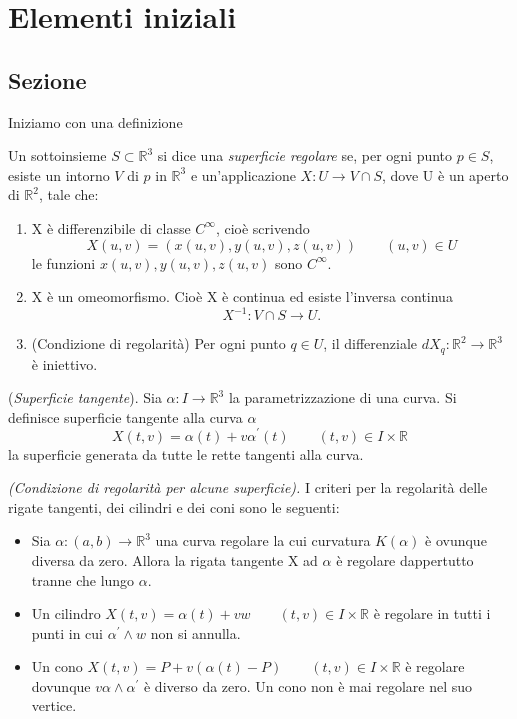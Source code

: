 

\chapter{Elementi iniziali}
\section{Sezione}
Iniziamo con una definizione
\begin{defin}
Un sottoinsieme $S \subset \mathbb{R}^3$ si dice una \emph{superficie regolare} se, per ogni punto $p \in S$, esiste un 
intorno $V$ di $p$ in $\mathbb{R}^3$ e un'applicazione $X : U \rightarrow V \cap S $, dove U è un aperto di $\mathbb{R}^2$,
 tale che:
\begin{enumerate}
 \item  X è differenzibile di classe $C^{\infty}$, cioè scrivendo\\
$$X(u,v)=(x(u,v),y(u,v),z(u,v))  \qquad (u,v) \in U$$
le funzioni $x(u,v),y(u,v),z(u,v)$ sono $C^{\infty}$.
\item X è un omeomorfismo. Cioè X è continua ed esiste l'inversa continua
$$X^{-1} : V \cap S \rightarrow U. $$
\item (Condizione di regolarità) Per ogni punto $q \in U$, il differenziale $dX_q : \mathbb{R}^2 \rightarrow \mathbb{R}^3$
è iniettivo.
\end{enumerate}
\end{defin}
\begin{es}
 (\emph{Superficie tangente}). Sia $\alpha : I \rightarrow \mathbb{R}^3$ la parametrizzazione di una curva. Si definisce 
superficie tangente alla curva $\alpha$
$$X(t,v)=\alpha(t)+v\alpha^{'}(t) \qquad (t,v) \in I \times \mathbb{R}$$
la superficie generata da tutte le rette tangenti alla curva.
\end{es}

\begin{prop}
 \emph{(Condizione di regolarità per alcune superficie).} I criteri per la regolarità delle rigate tangenti, dei cilindri
 e dei coni sono le seguenti:
\begin{itemize}
 \item Sia $\alpha : (a,b) \rightarrow \mathbb{R}^3$ una curva regolare la cui curvatura $K(\alpha)$ è ovunque diversa da zero.
Allora la rigata tangente X ad $\alpha$ è regolare dappertutto tranne che lungo $\alpha$.
\item Un cilindro $X(t,v)=\alpha(t)+vw \qquad (t,v) \in I \times \mathbb{R}$ è regolare in tutti i punti in cui $\alpha^{'} \wedge w$
non si annulla.
\item Un cono $X(t,v)= P + v(\alpha(t)-P) \qquad (t,v) \in I \times \mathbb{R}$ è regolare dovunque $v\alpha \wedge 
\alpha^{'}$ è diverso da zero. Un cono non è mai regolare nel suo vertice.
\end{itemize}
\end{prop}

